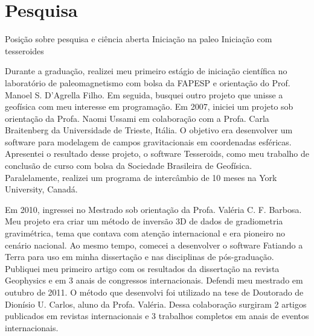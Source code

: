 \section{Pesquisa}

\citet{moho}

Posição sobre pesquisa e ciência aberta
Iniciação na paleo
Iniciação com tesseroides

Durante a graduação, realizei meu primeiro estágio de iniciação científica no
laboratório de paleomagnetismo com bolsa da FAPESP e orientação do Prof. Manoel
S. D'Agrella Filho. Em seguida, busquei outro projeto que unisse a geofísica
com meu interesse em programação. Em 2007, iniciei um projeto sob orientação da
Profa. Naomi Ussami em colaboração com a Profa. Carla Braitenberg da
Universidade de Trieste, Itália. O objetivo era desenvolver um software para
modelagem de campos gravitacionais em coordenadas esféricas. Apresentei o
resultado desse projeto, o software Tesseroids, como meu trabalho de conclusão
de curso com bolsa da Sociedade Brasileira de Geofísica. Paralelamente,
realizei um programa de intercâmbio de 10 meses na York University, Canadá.

Em 2010, ingressei no Mestrado sob orientação da Profa. Valéria C. F. Barbosa.
Meu projeto era criar um método de inversão 3D de dados de gradiometria
gravimétrica, tema que contava com atenção internacional e era pioneiro no
cenário nacional. Ao mesmo tempo, comecei a desenvolver o software Fatiando a
Terra para uso em minha dissertação e nas disciplinas de pós-graduação.
Publiquei meu primeiro artigo com os resultados da dissertação na revista
Geophysics e em 3 anais de congressos internacionais. Defendi meu mestrado em
outubro de 2011. O método que desenvolvi foi utilizado na tese de Doutorado de
Dionísio U. Carlos, aluno da Profa. Valéria. Dessa colaboração surgiram 2
artigos publicados em revistas internacionais e 3 trabalhos completos em anais
de eventos internacionais.

